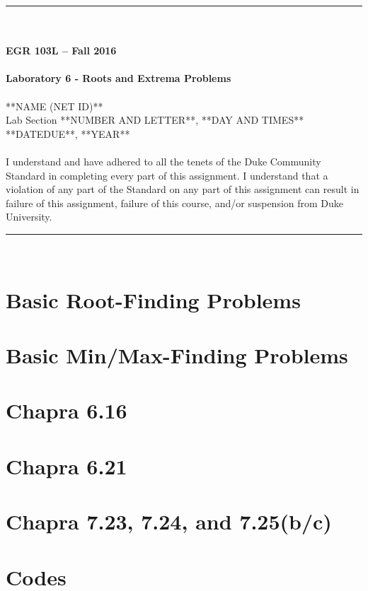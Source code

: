 \documentclass{article}
\begin{document}
\begin{center}
\rule{6.5in}{0.5mm}\\~\\
{\bf \large EGR 103L -- Fall 2016}\\~\\
{\huge \bf Laboratory 6 - Roots and Extrema Problems}\\~\\
**NAME (NET ID)**\\
Lab Section **NUMBER AND LETTER**, **DAY AND TIMES**\\
**DATEDUE**, **YEAR**\\~\\
{\small I understand and have adhered to all the tenets of the Duke
  Community Standard in completing every part of this assignment.  I
  understand that a violation of any part of the Standard on any part
  of this assignment can result in failure of this assignment, failure
  of this course, and/or suspension from Duke University.} 
\rule{6.5in}{0.5mm}\\
\end{center}
\tableofcontents
\listoffigures
\pagebreak

\section{Basic Root-Finding Problems}

\section{Basic Min/Max-Finding Problems}
 
\section{Chapra 6.16}

\section{Chapra 6.21}

\section{Chapra 7.23, 7.24, and 7.25(b/c)}

\pagebreak

\appendix
\section{Codes}
\end{document}
